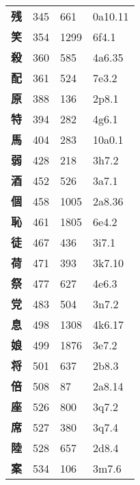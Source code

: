 \begin{longtable}[c]{llll}
    \bfseries 残 & 345 & 661 & 0a10.11\\
    \bfseries 笑 & 354 & 1299 & 6f4.1\\
    \bfseries 殺 & 360 & 585 & 4a6.35\\
    \bfseries 配 & 361 & 524 & 7e3.2\\
    \bfseries 原 & 388 & 136 & 2p8.1\\
    \bfseries 特 & 394 & 282 & 4g6.1\\
    \bfseries 馬 & 404 & 283 & 10a0.1\\
    \bfseries 弱 & 428 & 218 & 3h7.2\\
    \bfseries 酒 & 452 & 526 & 3a7.1\\
    \bfseries 個 & 458 & 1005 & 2a8.36\\
    \bfseries 恥 & 461 & 1805 & 6e4.2\\
    \bfseries 徒 & 467 & 436 & 3i7.1\\
    \bfseries 荷 & 471 & 393 & 3k7.10\\
    \bfseries 祭 & 477 & 627 & 4e6.3\\
    \bfseries 党 & 483 & 504 & 3n7.2\\
    \bfseries 息 & 498 & 1308 & 4k6.17\\
    \bfseries 娘 & 499 & 1876 & 3e7.2\\
    \bfseries 将 & 501 & 637 & 2b8.3\\
    \bfseries 倍 & 508 & 87 & 2a8.14\\
    \bfseries 座 & 526 & 800 & 3q7.2\\
    \bfseries 席 & 527 & 380 & 3q7.4\\
    \bfseries 陸 & 528 & 657 & 2d8.4\\
    \bfseries 案 & 534 & 106 & 3m7.6\\
  \end{longtable}
